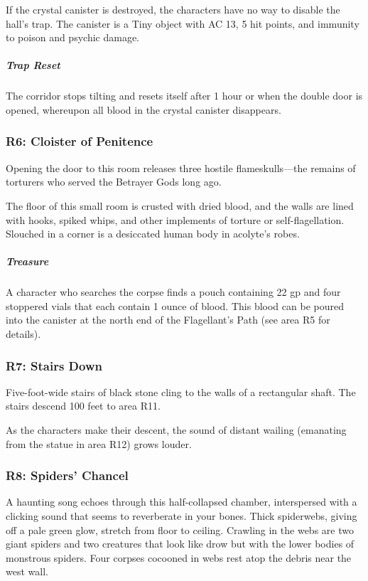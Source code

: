 \documentclass[10pt,a4paper,twoside,bg=print,twocolumn,openany,nodeprecatedcode]{dndbook}
\begin{document}
If the crystal canister is destroyed, the characters have no way to disable the hall's trap. The canister is a Tiny object with AC 13, 5 hit points, and immunity to poison and psychic damage.

\subparagraph{Trap Reset}
The corridor stops tilting and resets itself after 1 hour or when the double door is opened, whereupon all blood in the crystal canister disappears.

\subsubsection{R6: Cloister of Penitence}
Opening the door to this room releases three hostile flameskulls—the remains of torturers who served the Betrayer Gods long ago.

\begin{DndReadAloud}{}
The floor of this small room is crusted with dried blood, and the walls are lined with hooks, spiked whips, and other implements of torture or self-flagellation. Slouched in a corner is a desiccated human body in acolyte's robes.

\end{DndReadAloud}

\subparagraph{Treasure}
A character who searches the corpse finds a pouch containing 22 gp and four stoppered vials that each contain 1 ounce of blood. This blood can be poured into the canister at the north end of the Flagellant's Path (see area R5 for details).

\subsubsection{R7: Stairs Down}
Five-foot-wide stairs of black stone cling to the walls of a rectangular shaft. The stairs descend 100 feet to area R11.

As the characters make their descent, the sound of distant wailing (emanating from the statue in area R12) grows louder.

\subsubsection{R8: Spiders' Chancel}
\begin{DndReadAloud}{}
A haunting song echoes through this half-collapsed chamber, interspersed with a clicking sound that seems to reverberate in your bones. Thick spiderwebs, giving off a pale green glow, stretch from floor to ceiling. Crawling in the webs are two giant spiders and two creatures that look like drow but with the lower bodies of monstrous spiders. Four corpses cocooned in webs rest atop the debris near the west wall.

\end{DndReadAloud}
\end{document}
